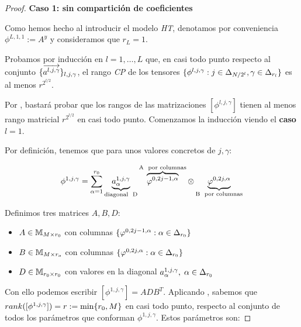 \begin{teorema}
\end{teorema}
\begin{proof}
    \textbf{Caso 1: sin compartición de coeficientes}

    Como hemos hecho al introducir el modelo \textit{HT}, denotamos por conveniencia $\phi^{L, 1, 1}:= A^y$ y consideramos que $r_L = 1$.

    Probamos por inducción en $l = 1, \ldots, L$ que, en casi todo punto respecto al conjunto $\{ \overrightarrow{a^{l, j, \gamma}} \}_{l, j, \gamma}$, el rango \textit{CP} de los tensores $\{ \phi^{l, j, \gamma}: j \in \Delta_{N/2^l}, \gamma \in \Delta_{r_l} \}$ es al menos $r^{2^{l/2}}$.

    Por , bastará probar que los rangos de las matrizaciones $[\phi^{l, j, \gamma}]$ tienen al menos rango matricial $r^{2^{l/2}}$ en casi todo punto. Comenzamos la inducción viendo el \textbf{caso $l = 1$}.

    Por definición, tenemos que para unos valores concretos de $j, \gamma$:

    \begin{equation}
        \phi^{1, j, \gamma} = \sum_{\alpha = 1}^{r_0} \underbrace{a_{\alpha}^{1, j, \gamma}}_\textrm{\text{diagonal } D} \overbrace{\varphi^{0, 2j - 1, \alpha}}^\textrm{A \text{ por columnas}} \otimes \underbrace{\varphi^{0, 2j, \alpha}}_\textrm{B \text{ por columnas}}
    \end{equation}

    Definimos tres matrices $A, B, D$:

    \begin{itemize}
        \item $A \in \mathbb{M}_{M \times r_0}$ con columnas $\{ \varphi^{0, 2j - 1, \alpha}: \alpha \in \Delta_{r_0} \}$
        \item $B \in \mathbb{M}_{M \times r_o}$ con columnas $\{ \varphi^{0, 2j, \alpha}: \alpha \in \Delta_{r_0} \}$
        \item $D \in \mathbb{M}_{r_0 \times r_0}$ con valores en la diagonal $a_{\alpha}^{1, j, \gamma}, \; \alpha \in \Delta_{r_0}$
    \end{itemize}

    Con ello podemos escribir $[\phi^{1, j, \gamma}] = A D B^T$. Aplicando , sabemos que $rank([\phi^{1, j, \gamma}]) = r := \min \{ r_0, M \}$ en casi todo punto, respecto al conjunto de todos los parámetros que conforman $\phi^{1, j, \gamma}$. Estos parámetros son:


\end{proof}
